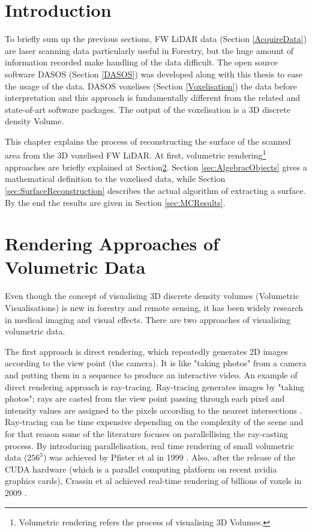 \documentclass{subfiles}
\begin{document}
	

\section{Introduction}


\par To briefly sum up the previous sections, FW LiDAR data (Section \ref{AcquireData}) are laser scanning data particularly useful in Forestry, but the huge amount of information recorded make handling of the data difficult. The open source software DASOS (Section \ref{DASOS}) was developed along with this thesis to ease the usage of the data. DASOS voxelises (Section \ref{Voxelisation}) the data before interpretation and this approach is fundamentally different from the related and state-of-art software packages. The output of the voxelisation is a 3D discrete density Volume. 


\par This chapter explains the process of reconstructing the surface of the scanned area from the 3D voxelised FW LiDAR. At first, volumetric rendering\footnote{Volumetric rendering refers the process of visualising 3D Volumes.} approaches are briefly explained at Section\ref{sec:RenderingApproaches}. Section \ref{sec:AlgebracObjects} gives a mathematical definition to the voxelised data, while Section \ref{sec:SurfaceReconstruction} describes the actual algorithm of extracting a surface. By the end the results are given in Section \ref{sec:MCResults}. 


\section{Rendering Approaches of Volumetric Data}\label{sec:RenderingApproaches}
\par Even though the concept of visualising 3D discrete density volumes (Volumetric Visualisations) is new in forestry and remote sensing, it has been widely research in medical imaging and visual effects. There are two approaches of visualising volumetric data.

\par The first approach is direct rendering, which repeatedly generates 2D images according to the view point (the camera). It is like "taking photos" from a camera and putting them in a sequence to produce an interactive video. An example of direct rendering approach is ray-tracing. Ray-tracing generates images by "taking photos"; rays are casted from the view point passing through each pixel and intensity values are assigned to the pixels according to the nearest intersections \cite{Hanrahan1983}. Ray-tracing can be time expensive depending on the complexity of the scene and for that reason some of the literature focuses on parallellising the ray-casting process. By introducing parallelisation, real time rendering of small volumetric data ($256^3$) was achieved by Pfister et al in 1999 \cite{Pfister1999}. Also, after the release of the CUDA hardware (which is a parallel computing platform on recent nvidia graphics cards), Crassin et al achieved real-time rendering of billions of voxels in 2009 \cite{Crassin2009}. 
	
\end{document}
